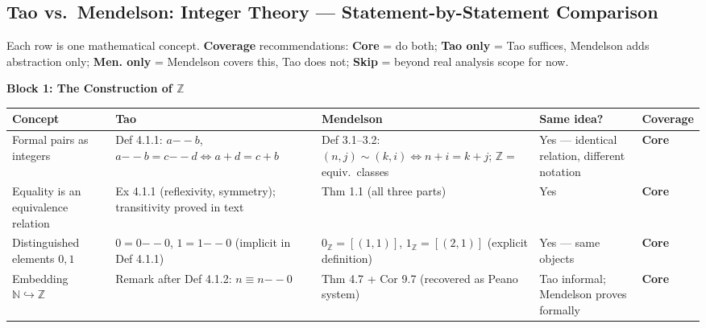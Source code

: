 
\clearpage
\subsection*{Tao vs.\ Mendelson: Integer Theory --- Statement-by-Statement Comparison}

\begin{remark*}
Each row is one mathematical concept.
\textbf{Coverage} recommendations: \textbf{Core} = do both;
\textbf{Tao only} = Tao suffices, Mendelson adds abstraction only;
\textbf{Men. only} = Mendelson covers this, Tao does not;
\textbf{Skip} = beyond real analysis scope for now.
\end{remark*}

\begin{exposition}
\bigskip
\end{exposition}

\noindent\textbf{Block 1: The Construction of $\mathbb{Z}$}

\begin{exposition}
\smallskip
\end{exposition}
\begin{tabular}{p{} p{} p{} p{} p{}}
\toprule
\textbf{Concept} & \textbf{Tao} & \textbf{Mendelson} & \textbf{Same idea?} & \textbf{Coverage} \\
\midrule

Formal pairs as integers
& Def 4.1.1: $a{-\!\!-}b$, $a{-\!\!-}b=c{-\!\!-}d\iff a+d=c+b$
& Def 3.1--3.2: $(n,j)\sim(k,i)\iff n+i=k+j$; $\mathbb{Z}=$ equiv.\ classes
& Yes --- identical relation, different notation
& \textbf{Core}
\\[6pt]

Equality is an equivalence relation
& Ex 4.1.1 (reflexivity, symmetry); transitivity proved in text
& Thm 1.1 (all three parts)
& Yes
& \textbf{Core}
\\[6pt]

Distinguished elements $0,1$
& $0=0{-\!\!-}0$, $1=1{-\!\!-}0$ (implicit in Def 4.1.1)
& $0_\mathbb{Z}=[(1,1)]$, $1_\mathbb{Z}=[(2,1)]$ (explicit definition)
& Yes --- same objects
& \textbf{Core}
\\[6pt]

Embedding $\mathbb{N}\hookrightarrow\mathbb{Z}$
& Remark after Def 4.1.2: $n\equiv n{-\!\!-}0$
& Thm 4.7 + Cor 9.7 (recovered as Peano system)
& Tao informal; Mendelson proves formally
& \textbf{Core}
\\

\bottomrule
\end{tabular}

